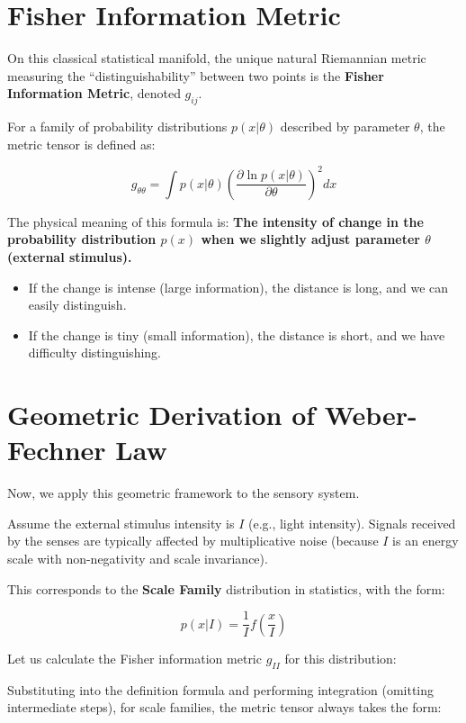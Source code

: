 \section{Fisher Information Metric}

On this classical statistical manifold, the unique natural Riemannian metric measuring the ``distinguishability'' between two points is the \textbf{Fisher Information Metric}, denoted $g_{ij}$.

For a family of probability distributions $p(x|\theta)$ described by parameter $\theta$, the metric tensor is defined as:

$$g_{\theta\theta} = \int p(x|\theta) \left( \frac{\partial \ln p(x|\theta)}{\partial \theta} \right)^2 dx$$

The physical meaning of this formula is: \textbf{The intensity of change in the probability distribution $p(x)$ when we slightly adjust parameter $\theta$ (external stimulus).}

\begin{itemize}
\item If the change is intense (large information), the distance is long, and we can easily distinguish.

\item If the change is tiny (small information), the distance is short, and we have difficulty distinguishing.
\end{itemize}

\section{Geometric Derivation of Weber-Fechner Law}

Now, we apply this geometric framework to the sensory system.

Assume the external stimulus intensity is $I$ (e.g., light intensity). Signals received by the senses are typically affected by multiplicative noise (because $I$ is an energy scale with non-negativity and scale invariance).

This corresponds to the \textbf{Scale Family} distribution in statistics, with the form:

$$p(x|I) = \frac{1}{I} f\left( \frac{x}{I} \right)$$

Let us calculate the Fisher information metric $g_{II}$ for this distribution:

Substituting into the definition formula and performing integration (omitting intermediate steps), for scale families, the metric tensor always takes the form:

